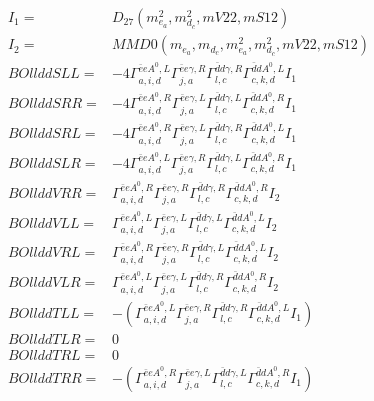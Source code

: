 \documentclass[A4,landscape]{article}
\begin{document}
\begin{align} 
I_1 = & D_{27}(m^2_{e_{{a}}}, m^2_{d_{{c}}}, mV22, mS12) \\ 
I_2 = & MMD0(m_{e_{{a}}}, m_{d_{{c}}}, m^2_{e_{{a}}}, m^2_{d_{{c}}}, mV22, mS12) \\ 
  BOllddSLL= & -4  \Gamma^{\bar{e}e A^0 ,L}_{a, i, d} \Gamma^{\bar{e}e \gamma ,R}_{j, a} \Gamma^{\bar{d}d \gamma ,R}_{l, c} \Gamma^{\bar{d}d A^0 ,L}_{c, k, d} I_1 \\ 
  BOllddSRR= & -4  \Gamma^{\bar{e}e A^0 ,R}_{a, i, d} \Gamma^{\bar{e}e \gamma ,L}_{j, a} \Gamma^{\bar{d}d \gamma ,L}_{l, c} \Gamma^{\bar{d}d A^0 ,R}_{c, k, d} I_1 \\ 
  BOllddSRL= & -4  \Gamma^{\bar{e}e A^0 ,R}_{a, i, d} \Gamma^{\bar{e}e \gamma ,L}_{j, a} \Gamma^{\bar{d}d \gamma ,R}_{l, c} \Gamma^{\bar{d}d A^0 ,L}_{c, k, d} I_1 \\ 
  BOllddSLR= & -4  \Gamma^{\bar{e}e A^0 ,L}_{a, i, d} \Gamma^{\bar{e}e \gamma ,R}_{j, a} \Gamma^{\bar{d}d \gamma ,L}_{l, c} \Gamma^{\bar{d}d A^0 ,R}_{c, k, d} I_1 \\ 
  BOllddVRR= &  \Gamma^{\bar{e}e A^0 ,R}_{a, i, d} \Gamma^{\bar{e}e \gamma ,R}_{j, a} \Gamma^{\bar{d}d \gamma ,R}_{l, c} \Gamma^{\bar{d}d A^0 ,R}_{c, k, d} I_2 \\ 
  BOllddVLL= &  \Gamma^{\bar{e}e A^0 ,L}_{a, i, d} \Gamma^{\bar{e}e \gamma ,L}_{j, a} \Gamma^{\bar{d}d \gamma ,L}_{l, c} \Gamma^{\bar{d}d A^0 ,L}_{c, k, d} I_2 \\ 
  BOllddVRL= &  \Gamma^{\bar{e}e A^0 ,R}_{a, i, d} \Gamma^{\bar{e}e \gamma ,R}_{j, a} \Gamma^{\bar{d}d \gamma ,L}_{l, c} \Gamma^{\bar{d}d A^0 ,L}_{c, k, d} I_2 \\ 
  BOllddVLR= &  \Gamma^{\bar{e}e A^0 ,L}_{a, i, d} \Gamma^{\bar{e}e \gamma ,L}_{j, a} \Gamma^{\bar{d}d \gamma ,R}_{l, c} \Gamma^{\bar{d}d A^0 ,R}_{c, k, d} I_2 \\ 
  BOllddTLL= & -( \Gamma^{\bar{e}e A^0 ,L}_{a, i, d} \Gamma^{\bar{e}e \gamma ,R}_{j, a} \Gamma^{\bar{d}d \gamma ,R}_{l, c} \Gamma^{\bar{d}d A^0 ,L}_{c, k, d} I_1) \\ 
  BOllddTLR= & 0 \\ 
  BOllddTRL= & 0 \\ 
  BOllddTRR= & -( \Gamma^{\bar{e}e A^0 ,R}_{a, i, d} \Gamma^{\bar{e}e \gamma ,L}_{j, a} \Gamma^{\bar{d}d \gamma ,L}_{l, c} \Gamma^{\bar{d}d A^0 ,R}_{c, k, d} I_1) \\ 
\end{align} 
\end{document}
